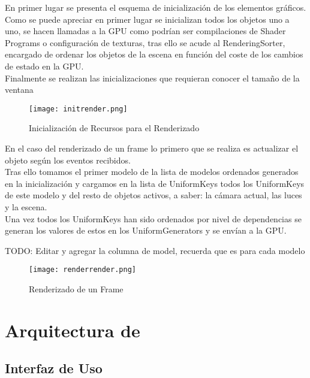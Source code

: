 En primer lugar se presenta el esquema de inicialización de los elementos gráficos.\\
Como se puede apreciar en primer lugar se inicializan todos los objetos uno a uno, se hacen llamadas a la GPU como podrían ser compilaciones de Shader Programs o configuración de texturas,
tras ello se acude al RenderingSorter, encargado de ordenar los objetos de la escena en función del coste de los cambios de estado en la GPU.\\
Finalmente se realizan las inicializaciones que requieran conocer el tamaño de la ventana 

\begin{figure}[h!]
\begin{center}
\texttt{[image: initrender.png]}
\end{center}
\caption[Inicialización de Recursos para el Renderizado]{Inicialización de Recursos para el Renderizado}
\label{fig:initrender}
\end{figure}

En el caso del renderizado de un frame lo primero que se realiza es actualizar el objeto según los eventos recibidos.\\
Tras ello tomamos el primer modelo de la lista de modelos ordenados generados en la inicialización y cargamos en la lista de UniformKeys todos los UniformKeys de este modelo y del resto de objetos activos, a saber: la cámara actual, las luces y la escena.\\
Una vez todos los UniformKeys han sido ordenados por nivel de dependencias se generan los valores de estos en los UniformGenerators y se envían a la GPU.

TODO: Editar y agregar la columna de model, recuerda que es para cada modelo
\begin{figure}[h!]
\begin{center}
\texttt{[image: renderrender.png]}
\end{center}
\caption[Renderizado de un Frame]{Renderizado de un Frame}
\label{fig:renderrender}
\end{figure}




\section{Arquitectura de \robotto}

\subsection{Interfaz de Uso}

